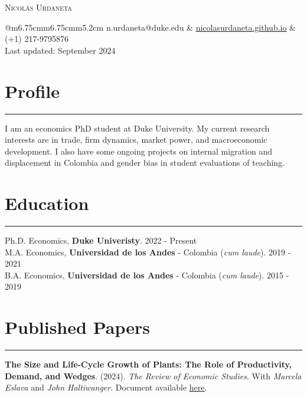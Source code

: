 \documentclass[12pt, letterpaper]{article}
\begin{document}
 

\begin{center}
{\Huge \textsc{Nicolás Urdaneta}}
\vspace*{5mm}

\begin{tabular}{@{}m{6.75cm}m{6.75cm}m{5.2cm}}
\noindent n.urdaneta@duke.edu & \href{nicolasurdaneta.github.io}{nicolasurdaneta.github.io} & (+1) 217-9795876 \\
Last updated: September 2024
\end{tabular}
\vspace*{-7mm}

\end{center}
\section*{Profile}
\vspace*{-8mm}
\noindent \rule{\linewidth}{0.2mm}
\noindent I am an economics PhD student at Duke University. My current research interests are in trade, firm dynamics, market power, and macroeconomic development. I also have some ongoing projects on internal migration and displacement in Colombia and gender bias in student evaluations of teaching. 

\vspace*{-4mm}

\section*{Education}
\vspace*{-8mm}
\noindent \rule{\linewidth}{0.2mm}
\noindent
Ph.D. Economics, \textbf{Duke Univeristy}. \hfill 2022 - Present \\
M.A. Economics, \textbf{Universidad de los Andes} - Colombia (\textit{cum laude}). \hfill 2019 - 2021 \\
B.A. Economics, \textbf{Universidad de los Andes} - Colombia (\textit{cum laude}). \hfill 2015 - 2019

\vspace*{-2mm}

\section*{Published Papers}
\vspace*{-8mm}
\noindent \rule{\linewidth}{0.2mm}
\noindent \textbf{The Size and Life-Cycle Growth of Plants: The Role of Productivity, Demand, and Wedges}. (2024). \textit{The Review of Economic Studies}.   With \textit{Marcela Eslava} and \textit{John Haltiwanger}. Document available \href{https://academic.oup.com/restud/advance-article/doi/10.1093/restud/rdad029/7054272?login=true}{here}. \\ [-3mm]
\end{document}
